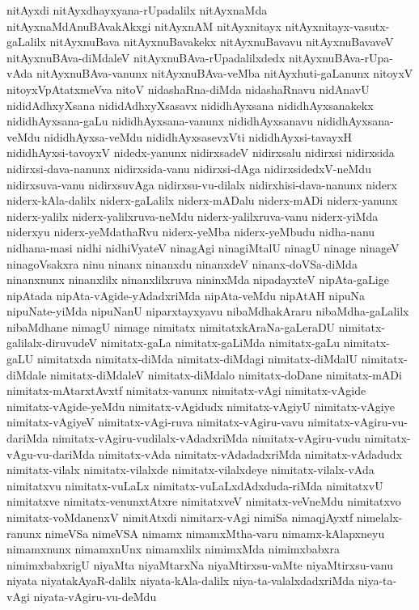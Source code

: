 {nitAyxdi
nitAyxdhayxyana-rUpadalilx
nitAyxnaMda
nitAyxnaMdAnuBAvakAkxgi
nitAyxnAM
nitAyxnitayx
nitAyxnitayx-vasutx-gaLalilx
nitAyxnuBava
nitAyxnuBavakekx
nitAyxnuBavavu
nitAyxnuBavaveV
nitAyxnuBAva-diMdaleV
nitAyxnuBAva-rUpadalilxdedx
nitAyxnuBAva-rUpa-vAda
nitAyxnuBAva-vanunx
nitAyxnuBAva-veMba
nitAyxhuti-gaLanunx
nitoyxV
nitoyxVpAtatxmeVva
nitoV
nidashaRna-diMda
nidashaRnavu
nidAnavU
nididAdhxyXsana
nididAdhxyXsasavx
nididhAyxsana
nididhAyxsanakekx
nididhAyxsana-gaLu
nididhAyxsana-vanunx
nididhAyxsanavu
nididhAyxsana-veMdu
nididhAyxsa-veMdu
nididhAyxsasevxVti
nididhAyxsi-tavayxH
nididhAyxsi-tavoyxV
nidedx-yanunx
nidirxsadeV
nidirxsalu
nidirxsi
nidirxsida
nidirxsi-dava-nanunx
nidirxsida-vanu
nidirxsi-dAga
nidirxsidedxV-neMdu
nidirxsuva-vanu
nidirxsuvAga
nidirxsu-vu-dilalx
nidirxhisi-dava-nanunx
niderx
niderx-kAla-dalilx
niderx-gaLalilx
niderx-mADalu
niderx-mADi
niderx-yanunx
niderx-yalilx
niderx-yalilxruva-neMdu
niderx-yalilxruva-vanu
niderx-yiMda
niderxyu
niderx-yeMdathaRvu
niderx-yeMba
niderx-yeMbudu
nidha-nanu
nidhana-masi
nidhi
nidhiVyateV
ninagAgi
ninagiMtalU
ninagU
ninage
ninageV
ninagoVsakxra
ninu
ninanx
ninanxdu
ninanxdeV
ninanx-doVSa-diMda
ninanxnunx
ninanxlilx
ninanxlilxruva
nininxMda
nipadayxteV
nipAta-gaLige
nipAtada
nipAta-vAgide-yAdadxriMda
nipAta-veMdu
nipAtAH
nipuNa
nipuNate-yiMda
nipuNanU
niparxtayxyavu
nibaMdhakAraru
nibaMdha-gaLalilx
nibaMdhane
nimagU
nimage
nimitatx
nimitatxkAraNa-gaLeraDU
nimitatx-galilalx-diruvudeV
nimitatx-gaLa
nimitatx-gaLiMda
nimitatx-gaLu
nimitatx-gaLU
nimitatxda
nimitatx-diMda
nimitatx-diMdagi
nimitatx-diMdalU
nimitatx-diMdale
nimitatx-diMdaleV
nimitatx-diMdalo
nimitatx-doDane
nimitatx-mADi
nimitatx-mAtarxtAvxtf
nimitatx-vanunx
nimitatx-vAgi
nimitatx-vAgide
nimitatx-vAgide-yeMdu
nimitatx-vAgidudx
nimitatx-vAgiyU
nimitatx-vAgiye
nimitatx-vAgiyeV
nimitatx-vAgi-ruva
nimitatx-vAgiru-vavu
nimitatx-vAgiru-vu-dariMda
nimitatx-vAgiru-vudilalx-vAdadxriMda
nimitatx-vAgiru-vudu
nimitatx-vAgu-vu-dariMda
nimitatx-vAda
nimitatx-vAdadadxriMda
nimitatx-vAdadudx
nimitatx-vilalx
nimitatx-vilalxde
nimitatx-vilalxdeye
nimitatx-vilalx-vAda
nimitatxvu
nimitatx-vuLaLx
nimitatx-vuLaLxdAdxduda-riMda
nimitatxvU
nimitatxve
nimitatx-venunxtAtxre
nimitatxveV
nimitatx-veVneMdu
nimitatxvo
nimitatx-voMdanenxV
nimitAtxdi
nimitarx-vAgi
nimiSa
nimaqjAyxtf
nimelalx-ranunx
nimeVSa
nimeVSA
nimamx
nimamxMtha-varu
nimamx-kAlapxneyu
nimamxnunx
nimamxnUnx
nimamxlilx
nimimxMda
nimimxbabxra
nimimxbabxrigU
niyaMta
niyaMtarxNa
niyaMtirxsu-vaMte
niyaMtirxsu-vanu
niyata
niyatakAyaR-dalilx
niyata-kAla-dalilx
niya-ta-valalxdadxriMda
niya-ta-vAgi
niyata-vAgiru-vu-deMdu
}
